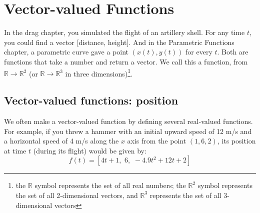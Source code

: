 \chapter{Vector-valued Functions}
In the drag chapter, you simulated the flight of an artillery shell. For
any time $t$, you could find a vector [distance, height]. And in the Parametric
Functions chapter, a parametric curve gave a point $(x(t), y(t))$ for every $t$.
Both are functions that take a number and return a vector. We call this a
 function, from
$\mathbb{R} \rightarrow \mathbb{R}^2$ (or $\mathbb{R} \rightarrow
\mathbb{R}^3$ in three dimensions)\footnote{the $\mathbb{R}$ symbol represents the
set of all real numbers; the $\mathbb{R}^2$ symbol represents the set of all 2-dimensional vectors, and $\mathbb{R}^3$ represents the set of all 3-dimensional vectors}.
\section{Vector-valued functions: position}


We often make a vector-valued function by defining several real-valued
functions. For example, if you threw a hammer with an initial upward
speed of 12 m/s and a horizontal speed of 4 m/s along the $x$ axis from
the point $(1, 6, 2)$, its position at time $t$ (during its flight) would be given by:
$$f(t) = [4t + 1, \,\, 6, \,\, -4.9t^2 + 12t + 2]$$

